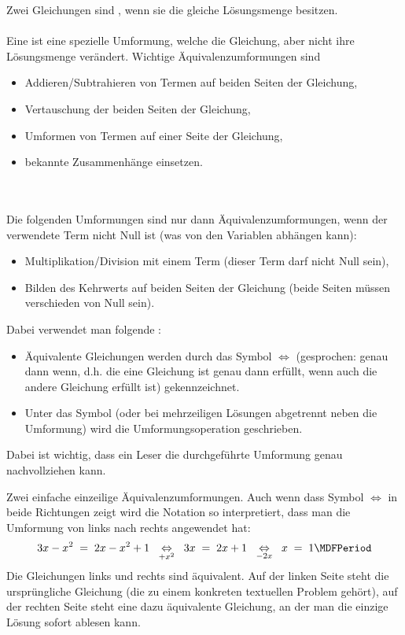 \begin{MIntro}
\begin{MInfo}
Zwei Gleichungen sind , wenn sie die gleiche Lösungsmenge besitzen.
\ \\ \ \\
Eine  ist eine spezielle Umformung, welche die Gleichung, aber nicht ihre Lösungsmenge verändert.
Wichtige Äquivalenzumformungen sind
\begin{itemize}
 \item{Addieren/Subtrahieren von Termen auf beiden Seiten der Gleichung,}
 \item{Vertauschung der beiden Seiten der Gleichung,}
 \item{Umformen von Termen auf einer Seite der Gleichung,}
 \item{bekannte Zusammenhänge einsetzen.}
 \end{itemize}
\ \\ \ \\
Die folgenden Umformungen sind nur dann Äquivalenzumformungen, wenn der verwendete Term nicht Null ist (was von den Variablen abhängen kann):
\begin{itemize}
 \item{Multiplikation/Division mit einem Term (dieser Term darf nicht Null sein),}
 \item{Bilden des Kehrwerts auf beiden Seiten der Gleichung (beide Seiten müssen verschieden von Null sein).}
\end{itemize}
\end{MInfo}

Dabei verwendet man folgende :
\begin{itemize}
 \item{Äquivalente Gleichungen werden durch das Symbol $\Leftrightarrow$ (gesprochen: genau dann wenn, d.h. die eine Gleichung ist genau dann erfüllt, wenn auch die andere Gleichung erfüllt ist) gekennzeichnet.}
 \item{Unter das Symbol (oder bei mehrzeiligen Lösungen abgetrennt neben die Umformung) wird die Umformungsoperation geschrieben.}
\end{itemize}

Dabei ist wichtig, dass ein Leser die durchgeführte Umformung genau nachvollziehen kann.

\begin{MExample}
Zwei einfache einzeilige Äquivalenzumformungen. Auch wenn dass Symbol $\Leftrightarrow$ in beide Richtungen zeigt wird die Notation so interpretiert, dass man die Umformung von links nach rechts angewendet hat:
$$
3x-x^2 \;=\; 2x-x^2+1\;\;\MUnderset{+x^2}\Leftrightarrow\;\;  3x\;=\; 2x+1 \;\;\MUnderset{-2x}\Leftrightarrow\;\; x \;=\; 1 \MDFPeriod
$$
Die Gleichungen links und rechts sind äquivalent. Auf der linken Seite steht die ursprüngliche Gleichung (die zu einem konkreten textuellen Problem gehört), auf der rechten Seite steht eine dazu
äquivalente Gleichung, an der man die einzige Lösung sofort ablesen kann.
\end{MExample}


\end{MIntro}
